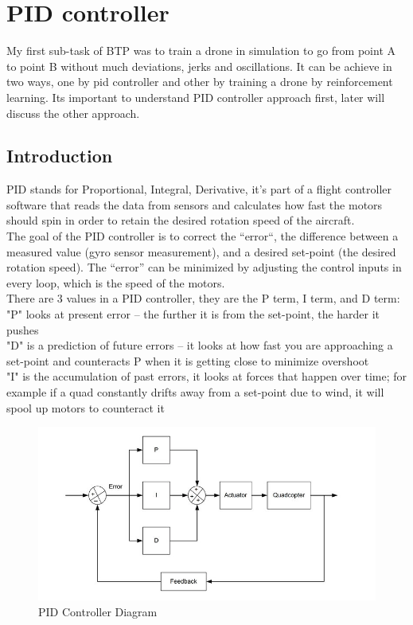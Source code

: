 \chapter{PID controller}

My first sub-task of BTP was to train a drone in simulation to go from point A to point B without much deviations, jerks and oscillations.
It can be achieve in two ways, one by pid controller and other by training a drone by reinforcement learning. 
Its important to understand PID controller approach first, later will discuss the other approach.
\section{Introduction}

PID stands for Proportional, Integral, Derivative, it’s part of a flight controller software that reads the data from sensors and calculates how fast the motors should spin in order to retain the desired rotation speed of the aircraft.
\\
The goal of the PID controller is to correct the “error“, the difference between a measured value (gyro sensor measurement), and a desired set-point (the desired rotation speed). The “error” can be minimized by adjusting the control inputs in every loop, which is the speed of the motors.
\\
There are 3 values in a PID controller, they are the P term, I term, and D term:
\\
"P" looks at present error –  the further it is from the set-point, the harder it pushes
\\"D" is a prediction of future errors – it looks at how fast you are approaching a set-point and counteracts P when it is getting close to minimize overshoot
\\"I" is the accumulation of past errors, it looks at forces that happen over time; for example if a quad constantly drifts away from a set-point due to wind, it will spool up motors to counteract it
\\
\begin{figure}
    \centering
    \includegraphics[width=\textwidth]{pid.png}
    \caption{PID Controller Diagram}
\end{figure}
